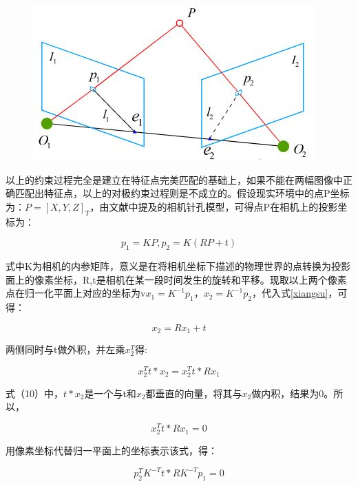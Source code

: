 \documentclass[10.5pt,twocolumn]{jbuaa}
\begin{document}
\begin{figure}[h!]
\centering
\includegraphics [scale=0.4,trim=0 0 0 0]{./image/duiji}
\end{figure}

以上的约束过程完全是建立在特征点完美匹配的基础上，如果不能在两幅图像中正确匹配出特征点，以上的对极约束过程则是不成立的。假设现实环境中的点P坐标为：$ P = [X,Y,Z]_{T} $，由文献\cite{gaoxiang14slam}中提及的相机针孔模型，可得点P在相机上的投影坐标为：

\begin{equation}
\label{xiangsu}
p_{1} = KP,p_{2} = K(RP+t)
\end{equation}

式中K为相机的内参矩阵，意义是在将相机坐标下描述的物理世界的点转换为投影面上的像素坐标，R,t是相机在某一段时间发生的旋转和平移。现取以上两个像素点在归一化平面上对应的坐标为v$ x_{1} = K^{-1}p_{1} $，$ x_{2} = K^{-1}p_{2} $，代入式\ref{xiangsu}，可得：

\begin{equation}
\label{guiyi}
x_{2} = Rx_{1}+t
\end{equation}

两侧同时与t做外积，并左乘$ x_{2}^T $得:

\begin{equation}
x_{2}^Tt * x_{2} = x_{2}^Tt * Rx_{1}
\end{equation}

式（10）中，$ t*x_{2} $是一个与t和$ x_{2} $都垂直的向量，将其与$ x_{2} $做内积，结果为0。所以，

\begin{equation}
x_{2}^Tt * Rx_{1} = 0
\end{equation}

用像素坐标代替归一平面上的坐标表示该式，得：

\begin{equation}
p_{2}^{T}K^{-T}t * RK^{-T}p_{1}=0
\end{equation}
\end{document}
